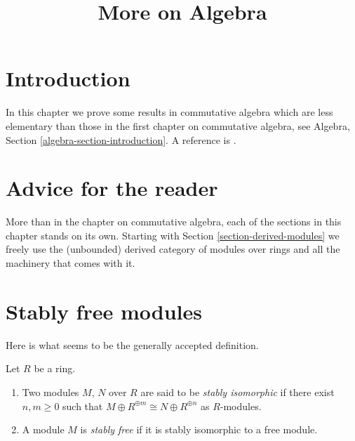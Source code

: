 

%


\title{More on Algebra}


\maketitle

\label{section-phantom}

\tableofcontents



\section{Introduction}
\label{section-introduction}

\noindent
In this chapter we prove some results in commutative algebra which
are less elementary than those in the first chapter on commutative
algebra, see
Algebra, Section \ref{algebra-section-introduction}.
A reference is \cite{MatCA}.






\section{Advice for the reader}
\label{section-advice}

\noindent
More than in the chapter on commutative algebra, each of the sections in
this chapter stands on its own. Starting with
Section \ref{section-derived-modules}
we freely use the (unbounded) derived category of modules over rings and all
the machinery that comes with it.




\section{Stably free modules}
\label{section-stably-free}

\noindent
Here is what seems to be the generally accepted definition.

\begin{definition}
\label{definition-stably-free}
Let $R$ be a ring. 
\begin{enumerate}
\item Two modules $M$, $N$ over $R$ are said to be
{\it stably isomorphic} if there exist $n, m \geq 0$ such
that $M \oplus R^{\oplus m} \cong N \oplus R^{\oplus n}$
as $R$-modules.
\item A module $M$ is {\it stably free} if it is stably isomorphic
to a free module.
\end{enumerate}
\end{definition}

